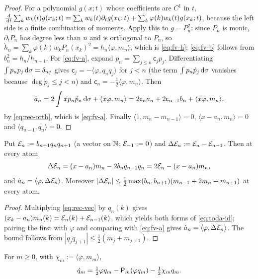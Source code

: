 \begin{proof}
For a polynomial $g(x;t)$ whose coefficients are $C^1$ in $t$,
$\frac{\,\mathrm{d}}{\,\mathrm{d} t}\sum_kw_k(t)g(x_k;t)=\sum_kw_k(t)\partial_tg(x_k;t)+\sum_k\varphi(k)w_k(t)g(x_k;t)$, because the
left side is a finite combination of moments. Apply this to $g=P_n^2$: since $P_n$ is monic, $\partial_tP_n$ has
degree less than $n$ and is orthogonal to $P_n$, so $\dot h_n=\sum_k\varphi(k)w_kP_n(x_k)^2=h_n\langle\varphi,m_n\rangle$,
which is \eqref{eq:fv-h}; \eqref{eq:fv-b} follows from $b_n^2=h_n/h_{n-1}$. For \eqref{eq:fv-a}, expand
$\dot p_n=\sum_{j\le n}\mathsf c_jp_j$. Differentiating $\int p_np_j\,\mathrm{d}\sigma=\delta_{nj}$ gives
$\mathsf c_j=-\langle\varphi,q_nq_j\rangle$ for $j<n$ (the term $\int p_n\dot p_j\,\mathrm{d}\sigma$ vanishes because
$\deg\dot p_j\le j<n$) and $\mathsf c_n=-\frac12\langle\varphi,m_n\rangle$. Then
\[
  \dot a_n=2\int xp_n\dot p_n\,\mathrm{d}\sigma+\langle x\varphi,m_n\rangle=2\mathsf c_na_n+2\mathsf c_{n-1}b_n
  +\langle x\varphi,m_n\rangle,
\]
by \eqref{eq:rec-orth}, which is \eqref{eq:fv-a}. Finally $\langle1,m_n-m_{n-1}\rangle=0$,
$\langle x-a_n,m_n\rangle=0$ and $\langle q_{n-1},q_n\rangle=0$.
\end{proof}

\begin{lemma}\label{lem:toda}
Put $\mathcal{E}_n:=b_{n+1}q_nq_{n+1}$ \textup{(}a vector on $\mathbb{N}$; $\mathcal{E}_{-1}:=0$\textup{)} and $\Delta\mathcal{E}_n:=\mathcal{E}_n-\mathcal{E}_{n-1}$. Then
at every atom
\begin{equation}\label{eq:toda-id}
  \Delta\mathcal{E}_n=(x-a_n)m_n-2b_nq_{n-1}q_n=2\mathcal{E}_n-(x-a_n)m_n,
\end{equation}
and $\dot a_n=\langle\varphi,\Delta\mathcal{E}_n\rangle$. Moreover $|\Delta\mathcal{E}_n|\le\frac12\max(b_n,b_{n+1})
(m_{n-1}+2m_n+m_{n+1})$ at every atom.
\end{lemma}

\begin{proof}
Multiplying \eqref{eq:rec-vec} by $q_n(k)$ gives $(x_k-a_n)m_n(k)=\mathcal{E}_n(k)+\mathcal{E}_{n-1}(k)$, which yields both forms of
\eqref{eq:toda-id}; pairing the first with $\varphi$ and comparing with \eqref{eq:fv-a} gives
$\dot a_n=\langle\varphi,\Delta\mathcal{E}_n\rangle$. The bound follows from $|q_jq_{j+1}|\le\frac12(m_j+m_{j+1})$.
\end{proof}

\begin{lemma}\label{lem:qdot}
For $m\ge0$, with $\chi_m:=\langle\varphi,m_m\rangle$,
\[
  \dot q_m=\tfrac12\varphi q_m-\mathsf{P}_m(\varphi q_m)-\tfrac12\chi_mq_m .
\]
\end{lemma}

